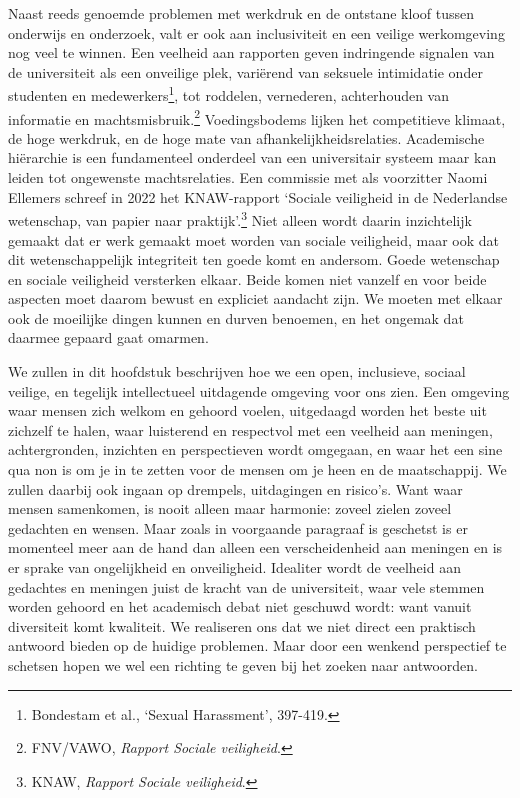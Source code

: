 \documentclass[smallauthor, chapterhaspagenum, nochapterinheader, pagenuminheader,  bigchapnum,medium2, tocpages, garamond, titleinheader]{jote-book}
\begin{document}
	Naast reeds genoemde problemen met werkdruk en de ontstane kloof tussen onderwijs en onderzoek, valt er ook aan inclusiviteit en een veilige werkomgeving nog veel te winnen. Een veelheid aan rapporten geven indringende signalen van de universiteit als een onveilige plek, variërend van seksuele intimidatie onder studenten en medewerkers\footnote{Bondestam et al., ‘Sexual Harassment', 397-419.}, tot roddelen, vernederen, achterhouden van informatie en machtsmisbruik.\footnote{FNV/VAWO, \emph{Rapport Sociale veiligheid}. } Voedingsbodems lijken het competitieve klimaat, de hoge werkdruk, en de hoge mate van afhankelijkheidsrelaties. Academische hiërarchie is een fundamenteel onderdeel van een universitair systeem maar kan leiden tot ongewenste machtsrelaties. Een commissie met als voorzitter Naomi Ellemers schreef in 2022 het KNAW-rapport ‘Sociale veiligheid in de Nederlandse wetenschap, van papier naar praktijk'.\footnote{KNAW, \emph{Rapport Sociale veiligheid}.} Niet alleen wordt daarin inzichtelijk gemaakt dat er werk gemaakt moet worden van sociale veiligheid, maar ook dat dit wetenschappelijk integriteit ten goede komt en andersom. Goede wetenschap en sociale veiligheid versterken elkaar. Beide komen niet vanzelf en voor beide aspecten moet daarom bewust en expliciet aandacht zijn. We moeten met elkaar ook de moeilijke dingen kunnen en durven benoemen, en het ongemak dat daarmee gepaard gaat omarmen.



	We zullen in dit hoofdstuk beschrijven hoe we een open, inclusieve, sociaal veilige, en tegelijk intellectueel uitdagende omgeving voor ons zien. Een omgeving waar mensen zich welkom en gehoord voelen, uitgedaagd worden het beste uit zichzelf te halen, waar luisterend en respectvol met een veelheid aan meningen, achtergronden, inzichten en perspectieven wordt omgegaan, en waar het een sine qua non is om je in te zetten voor de mensen om je heen en de maatschappij. We zullen daarbij ook ingaan op drempels, uitdagingen en risico's. Want waar mensen samenkomen, is nooit alleen maar harmonie: zoveel zielen zoveel gedachten en wensen. Maar zoals in voorgaande paragraaf is geschetst is er momenteel meer aan de hand dan alleen een verscheidenheid aan meningen en is er sprake van ongelijkheid en onveiligheid. Idealiter wordt de veelheid aan gedachtes en meningen juist de kracht van de universiteit, waar vele stemmen worden gehoord en het academisch debat niet geschuwd wordt: want vanuit diversiteit komt kwaliteit. We realiseren ons dat we niet direct een praktisch antwoord bieden op de huidige problemen. Maar door een wenkend perspectief te schetsen hopen we wel een richting te geven bij het zoeken naar antwoorden.
\end{document}
